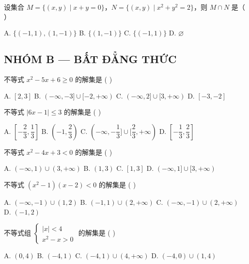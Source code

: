 \documentclass[11pt, a4paper]{article}
\begin{document}
\begin{baitap}[12]
设集合 $M=\{(x,y)\mid x+y=0\}$，$N=\{(x,y)\mid x^2+y^2=2\}$，则 $M\cap N$ 是（ ）
\par\vspace{3pt}
\noindent A. $\{(-1,1),(1,-1)\}$ \quad B. $\{(1,-1)\}$ \quad C. $\{(-1,1)\}$ \quad D. $\varnothing$
\end{baitap}

\subsection*{NHÓM B — BẤT ĐẲNG THỨC}

\begin{baitap}[13]
不等式 $x^2 - 5x + 6 \ge 0$ 的解集是 ( )
\par\vspace{3pt}
\noindent A. $[2,3]$ \quad B. $(-\infty, -3] \cup [-2, +\infty)$ \quad C. $(-\infty, 2] \cup [3, +\infty)$ \quad D. $[-3, -2]$
\end{baitap}

\begin{baitap}[14]
不等式 $|6x - 1| \le 3$ 的解集是 ( )
\par\vspace{3pt}
\noindent A. $[-\dfrac{2}{3}, \dfrac{1}{3}]$ \quad B. $(-1, \dfrac{2}{3})$ \quad C. $(-\infty, -\dfrac{1}{3}] \cup [\dfrac{2}{3}, +\infty)$ \quad D. $[-\dfrac{1}{3}, \dfrac{2}{3}]$
\end{baitap}

\begin{baitap}[15]
不等式 $x^2 - 4x + 3 < 0$ 的解集是 ( )
\par\vspace{3pt}
\noindent A. $(-\infty, 1) \cup (3, +\infty)$ \quad B. $(1,3)$ \quad C. $[1,3]$ \quad D. $(-\infty, 1] \cup [3, +\infty)$
\end{baitap}

\begin{baitap}[16]
不等式 $(x^2 - 1)(x - 2) < 0$ 的解集是 ( )
\par\vspace{3pt}
\noindent A. $(-\infty, -1) \cup (1,2)$ \quad B. $(-1,1) \cup (2, +\infty)$ \quad C. $(-\infty, -1) \cup (2, +\infty)$ \quad D. $(-1,2)$
\end{baitap}

\begin{baitap}[17]
不等式组 $\begin{cases} |x| < 4 \\ x^2 - x > 0 \end{cases}$ 的解集是 ( )
\par\vspace{3pt}
\noindent A. $(0,4)$ \quad B. $(-4,1)$ \quad C. $(-4,1) \cup (4, +\infty)$ \quad D. $(-4,0) \cup (1,4)$
\end{baitap}
\end{document}
